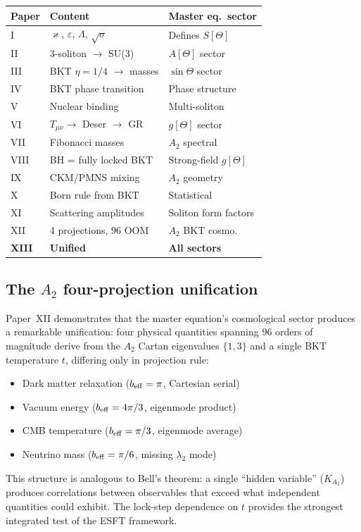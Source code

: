 \documentclass[twocolumn,preprintnumbers,amsmath,amssymb,prd]{revtex4-2}
\begin{document}
\begin{center}
\begin{tabular}{lll}
\toprule
Paper & Content & Master eq.\ sector \\
\midrule
I & $\varkappa$, $\varepsilon$, $\Lambda$, $\sqrt{\sigma}$ & Defines $S[\Theta]$ \\
II & 3-soliton $\to$ SU(3) & $A[\Theta]$ sector \\
III & BKT $\eta = 1/4$ $\to$ masses & $\sin\Theta$ sector \\
IV & BKT phase transition & Phase structure \\
V & Nuclear binding & Multi-soliton \\
VI & $T_{\mu\nu} \to$ Deser $\to$ GR & $g[\Theta]$ sector \\
VII & Fibonacci masses & $A_2$ spectral \\
VIII & BH = fully locked BKT & Strong-field $g[\Theta]$ \\
IX & CKM/PMNS mixing & $A_2$ geometry \\
X & Born rule from BKT & Statistical \\
XI & Scattering amplitudes & Soliton form factors \\
XII & 4 projections, 96 OOM & $A_2$ BKT cosmo. \\
\textbf{XIII} & \textbf{Unified} & \textbf{All sectors} \\
\bottomrule
\end{tabular}
\end{center}

\subsection{The $A_2$ four-projection unification}

Paper~XII demonstrates that the master equation's cosmological sector produces a remarkable unification: four physical quantities spanning 96 orders of magnitude derive from the $A_2$ Cartan eigenvalues $\{1,3\}$ and a single BKT temperature $t$, differing only in projection rule:
\begin{itemize}
\item Dark matter relaxation ($b_{\rm eff} = \pi$, Cartesian serial)
\item Vacuum energy ($b_{\rm eff} = 4\pi/3$, eigenmode product)
\item CMB temperature ($b_{\rm eff} = \pi/3$, eigenmode average)
\item Neutrino mass ($b_{\rm eff} = \pi/6$, missing $\lambda_2$ mode)
\end{itemize}
This structure is analogous to Bell's theorem: a single ``hidden variable'' ($K_{A_2}$) produces correlations between observables that exceed what independent quantities could exhibit.
The lock-step dependence on $t$ provides the strongest integrated test of the ESFT framework.
\end{document}
